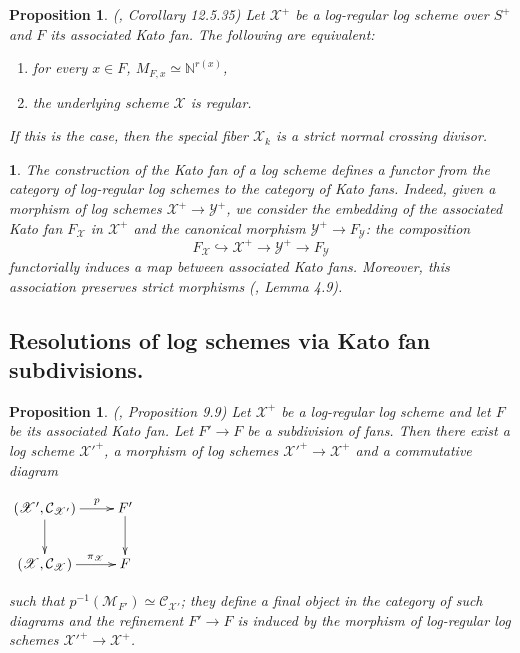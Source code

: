 \documentclass{amsart}%
\numberwithin{equation}{subsection}
\theoremstyle{plain2}
\newtheorem{prop}[equation]{Proposition}
\theoremstyle{definition2}
\theoremstyle{stepstyle}
\theoremstyle{point}
\theoremstyle{subpoint}
\newtheorem{subpoint}[equation]{}%
\newcommand{\spa}[1]{\begin{subpoint}#1\end{subpoint}}           %
\newcommand{\N}{\ensuremath{\mathbb{N}}}
\newcommand{\cX}{\ensuremath{\mathscr{X}}}
\newcommand{\caM}{\ensuremath{\mathcal{M}}}
\newcommand{\caC}{\ensuremath{\mathcal{C}}}
\newcommand{\cY}{\ensuremath{\mathscr{Y}}}
\renewcommand{\cY}{\ensuremath{\mathscr{Y}}}
\begin{document}
\begin{prop} \label{resolution log scheme kato fan} (\cite{GabberRamero}, Corollary 12.5.35)
Let $\cX^+$ be a log-regular log scheme over $S^+$ and $F$ its associated Kato fan. The following are equivalent: \begin{enumerate}
\item for every $x \in F$, $M_{F,x} \simeq \N^{r(x)}$,
\item the underlying scheme $\cX$ is regular.
\end{enumerate}
If this is the case, then the special fiber $\cX_k$ is a strict normal crossing divisor.
\end{prop}
\spa{The construction of the Kato fan of a log scheme defines a functor from the category of log-regular log schemes to the category of Kato fans. Indeed, given a morphism of log schemes $\cX^+ \rightarrow \cY^+$, we consider the embedding of the associated Kato fan $F_{\cX}$ in $\cX^+$ and the canonical morphism $\cY^+ \rightarrow F_{\cY}$: the composition $$F_{\cX} \hookrightarrow \cX^+ \rightarrow \cY^+ \rightarrow F_\cY$$ functorially induces a map between associated Kato fans. Moreover, this association preserves strict morphisms (\cite{Ulirsch2013}, Lemma 4.9).}
\subsection{Resolutions of log schemes via Kato fan subdivisions.} \label{section resolution via kato subd}
\begin{prop} (\cite{Kato1994a}, Proposition 9.9) \label{prop morphism induced by subdivision kato fan}
Let $\cX^+$ be a log-regular log scheme and let $F$ be its associated Kato fan. Let $F' \rightarrow F$ be a subdivision of fans. Then there exist a log scheme ${\cX'}^+$, a morphism of log schemes ${\cX'}^+ \rightarrow \cX^+$ and a commutative diagram
\begin{center}
$\begin{gathered}
\xymatrixcolsep{2pc} \xymatrix{
  (\cX', \caC_{\cX'}) \ar[r]^-{p} \ar[d]^{} & F' \ar[d]^{}\\
  (\cX, \caC_{\cX}) \ar[r]^-{\pi_{\cX}}   & F
}
\end{gathered}$\end{center}such that $p^{-1}(\caM_{F'}) \simeq \caC_{\cX'}$; they define a final object in the category of such diagrams and the refinement $F'\to F$ is induced by the morphism of log-regular log schemes $\cX'^+ \rightarrow \cX^+$.
\end{prop}
\end{document}
